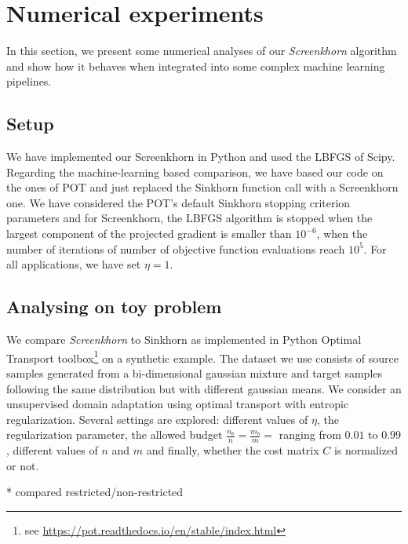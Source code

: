 
\section{Numerical experiments} %
\label{sec:numerical_experiments}

In this section, we present some numerical analyses of our
\emph{Screenkhorn} algorithm and show how it behaves when
integrated into some complex machine learning pipelines.

\subsection{Setup}

We have implemented our Screenkhorn in Python and used the LBFGS of
Scipy. Regarding the machine-learning based comparison, we have based our code
on the ones of POT \cite{flamary2017pot} and just replaced the Sinkhorn function call with a Screenkhorn one. We have considered the POT's default Sinkhorn stopping criterion parameters and for Screenkhorn, the LBFGS algorithm is stopped when the 
largest component of the projected gradient is smaller than $10^{-6}$, when the number of iterations of number of objective function evaluations reach $10^{5}$. For all applications, we have set $\eta=1$.

\subsection{Analysing on toy problem}
We compare \emph{Screenkhorn} to Sinkhorn as implemented in Python Optimal Transport toolbox\footnote{see \url{https://pot.readthedocs.io/en/stable/index.html}} on  a synthetic example. The dataset we use consists of source samples generated from a bi-dimensional gaussian mixture and target samples following the same distribution but with different gaussian means. We consider an unsupervised domain adaptation using optimal transport with entropic regularization.  Several settings are explored: different values of $\eta$, the regularization parameter, the allowed budget $\frac{n_b}{n} = \frac{m_b}{m} = $ ranging from $0.01$ to $0.99$, different values of $n$ and $m$ and finally, whether the cost matrix $C$ is normalized or not. 

* compared restricted/non-restricted





























